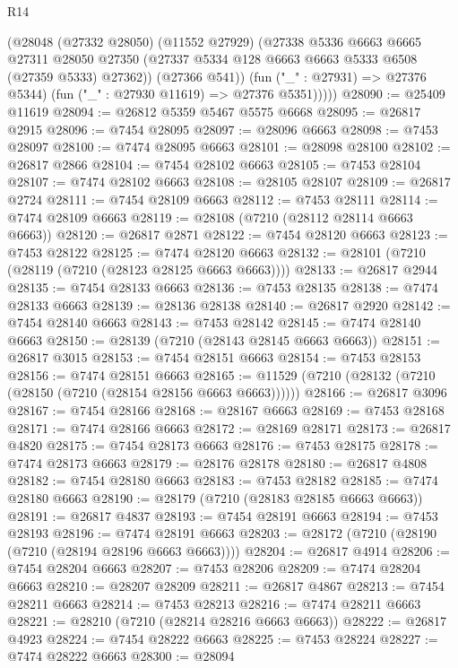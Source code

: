\begin{lexlean}{R14}
\begin{coremodule}
            (@28048
              (@27332 @28050)
              (@11552 @27929)
              (@27338
                @5336
                @6663
                @6665
                @27311
                @28050
                @27350
                (@27337 @5334 @128 @6663 @6663 @5333 @6508 (@27359 @5333) @27362))
              (@27366 @541))
            (fun ("_" : @27931) => @27376 @5344)
            (fun ("_" : @27930 @11619) => @27376 @5351)))))
@28090 := @25409 @11619
@28094 := @26812 @5359 @5467 @5575 @6668
@28095 := @26817 @2915
@28096 := @7454 @28095
@28097 := @28096 @6663
@28098 := @7453 @28097
@28100 := @7474 @28095 @6663
@28101 := @28098 @28100
@28102 := @26817 @2866
@28104 := @7454 @28102 @6663
@28105 := @7453 @28104
@28107 := @7474 @28102 @6663
@28108 := @28105 @28107
@28109 := @26817 @2724
@28111 := @7454 @28109 @6663
@28112 := @7453 @28111
@28114 := @7474 @28109 @6663
@28119 := @28108 (@7210 (@28112 @28114 @6663 @6663))
@28120 := @26817 @2871
@28122 := @7454 @28120 @6663
@28123 := @7453 @28122
@28125 := @7474 @28120 @6663
@28132 := @28101 (@7210 (@28119 (@7210 (@28123 @28125 @6663 @6663))))
@28133 := @26817 @2944
@28135 := @7454 @28133 @6663
@28136 := @7453 @28135
@28138 := @7474 @28133 @6663
@28139 := @28136 @28138
@28140 := @26817 @2920
@28142 := @7454 @28140 @6663
@28143 := @7453 @28142
@28145 := @7474 @28140 @6663
@28150 := @28139 (@7210 (@28143 @28145 @6663 @6663))
@28151 := @26817 @3015
@28153 := @7454 @28151 @6663
@28154 := @7453 @28153
@28156 := @7474 @28151 @6663
@28165 := @11529 (@7210 (@28132 (@7210 (@28150 (@7210 (@28154 @28156 @6663 @6663))))))
@28166 := @26817 @3096
@28167 := @7454 @28166
@28168 := @28167 @6663
@28169 := @7453 @28168
@28171 := @7474 @28166 @6663
@28172 := @28169 @28171
@28173 := @26817 @4820
@28175 := @7454 @28173 @6663
@28176 := @7453 @28175
@28178 := @7474 @28173 @6663
@28179 := @28176 @28178
@28180 := @26817 @4808
@28182 := @7454 @28180 @6663
@28183 := @7453 @28182
@28185 := @7474 @28180 @6663
@28190 := @28179 (@7210 (@28183 @28185 @6663 @6663))
@28191 := @26817 @4837
@28193 := @7454 @28191 @6663
@28194 := @7453 @28193
@28196 := @7474 @28191 @6663
@28203 := @28172 (@7210 (@28190 (@7210 (@28194 @28196 @6663 @6663))))
@28204 := @26817 @4914
@28206 := @7454 @28204 @6663
@28207 := @7453 @28206
@28209 := @7474 @28204 @6663
@28210 := @28207 @28209
@28211 := @26817 @4867
@28213 := @7454 @28211 @6663
@28214 := @7453 @28213
@28216 := @7474 @28211 @6663
@28221 := @28210 (@7210 (@28214 @28216 @6663 @6663))
@28222 := @26817 @4923
@28224 := @7454 @28222 @6663
@28225 := @7453 @28224
@28227 := @7474 @28222 @6663
@28300 := @28094

\end{coremodule}
\end{lexlean}
